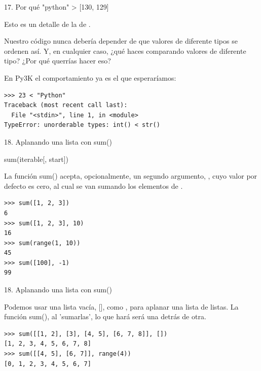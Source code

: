 \documentclass[14pt]{beamer}
\begin{document}
\begin{frame}[fragile]{17. Por qué "python" > [130, 129]}
  \begin{alertblock}{}
    \centering
    Esto es un detalle de la  de
    .
  \end{alertblock}

  \small
  \begin{center}
    Nuestro código nunca debería depender de que valores de diferente
    tipos se ordenen así. Y, en cualquier caso, ¿qué haces comparando
    valores de diferente tipo? ¿Por qué querrías hacer eso?
  \end{center}

  \begin{exampleblock}
    {\centering En Py3K el comportamiento ya es el que esperaríamos:}
    \begin{lstlisting}
>>> 23 < "Python"
Traceback (most recent call last):
  File "<stdin>", line 1, in <module>
TypeError: unorderable types: int() < str()
    \end{lstlisting}
  \end{exampleblock}
\end{frame}

\begin{frame}[fragile]{18. Aplanando una lista con sum()}
  \begin{block}{}
    \centering \LARGE sum(iterable[, start])
  \end{block}

  \small
  \begin{center}
    \centering
    La función sum() acepta, opcionalmente, un segundo argumento,
    , cuyo valor por defecto es cero, al cual se van
    sumando los elementos de .
  \end{center}

  \footnotesize
  \begin{exampleblock}{}
    \begin{lstlisting}
>>> sum([1, 2, 3])
6
>>> sum([1, 2, 3], 10)
16
>>> sum(range(1, 10))
45
>>> sum([100], -1)
99
    \end{lstlisting}
  \end{exampleblock}
\end{frame}

\begin{frame}[fragile]{18. Aplanando una lista con sum()}
  \begin{block}{}
    \centering
    Podemos usar una lista vacía, [], como , para aplanar
    una lista de listas. La función sum(), al 'sumarlas', lo que hará será
     una detrás de otra.
  \end{block}

  \small
  \begin{exampleblock}{}
    \begin{lstlisting}
>>> sum([[1, 2], [3], [4, 5], [6, 7, 8]], [])
[1, 2, 3, 4, 5, 6, 7, 8]
>>> sum([[4, 5], [6, 7]], range(4))
[0, 1, 2, 3, 4, 5, 6, 7]
    \end{lstlisting}
  \end{exampleblock}
\end{frame}
\end{document}
